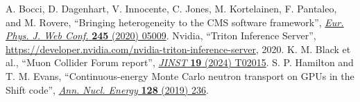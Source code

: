\begin{thebibliography}{99}
 A. Bocci, D. Dagenhart, V. Innocente, C. Jones, M. Kortelainen, F. Pantaleo, and M. Rovere, ``Bringing heterogeneity to the CMS software framework'', \href{https://doi.org/10.1051/epjconf/202024505009}{\textit{Eur. Phys. J. Web Conf.} \textbf{245} (2020) 05009}.
 Nvidia, ``Triton Inference Server'', \href{https://developer.nvidia.com/nvidia-triton-inference-server}{https://developer.nvidia.com/nvidia-triton-inference-server}, 2020.
 K. M. Black et al., ``Muon Collider Forum report'', \href{https://doi.org/10.1088/1748-0221/19/02/T02015}{\textit{JINST} \textbf{19} (2024) T02015}.
 S. P. Hamilton and T. M. Evans, ``Continuous-energy Monte Carlo neutron transport on GPUs in the Shift code'', \href{https://doi.org/10.1016/j.anucene.2019.01.012}{\textit{Ann. Nucl. Energy} \textbf{128} (2019) 236}.
\end{thebibliography}
